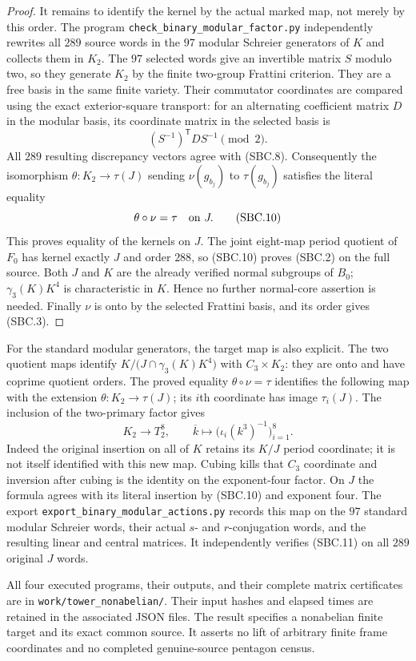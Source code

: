 \begin{proof}
It remains to identify the kernel by the actual marked map, not
merely by this order.  The program
\texttt{check\_binary\_modular\_factor.py} independently rewrites all
$289$ source words in the $97$ modular Schreier generators of $K$
and collects them in $K_2$.  The $97$ selected words give an
invertible matrix $S$ modulo two, so they generate $K_2$ by the
finite two-group Frattini criterion.  They are a free basis in the
same finite variety.  Their commutator coordinates are compared
using the exact exterior-square transport: for an alternating
coefficient matrix $D$ in the modular basis, its coordinate matrix
in the selected basis is
\[
                  (S^{-1})^{\mathsf T}DS^{-1}\pmod2.
\tag{SBC.9}
\]
All $289$ resulting discrepancy vectors agree with (SBC.8).
Consequently the isomorphism $\theta:K_2\to\tau(J)$ sending
$\nu(g_{b_j})$ to $\tau(g_{b_j})$ satisfies the literal equality
\[
                         \theta\circ\nu=\tau
                    \quad\hbox{on }J.
\tag{SBC.10}
\]
This proves equality of the kernels on $J$.  The joint eight-map
period quotient of $F_0$ has kernel exactly $J$ and order $288$,
so (SBC.10) proves (SBC.2) on the full source.  Both $J$ and $K$
are the already verified normal subgroups of $B_0$;
$\gamma_3(K)K^4$ is characteristic in $K$.  Hence no further
normal-core assertion is needed.  Finally $\nu$ is onto by the
selected Frattini basis, and its order gives (SBC.3).
\end{proof}

For the standard modular generators, the target map is also explicit.
The two quotient maps identify $K/\bigl(J\cap\gamma_3(K)K^4\bigr)$
with $C_3\times K_2$: they are onto and have coprime quotient orders.
The proved equality $\theta\circ\nu=\tau$ identifies the following
map with the extension $\theta:K_2\to\tau(J)$; its $i$th coordinate
has image $\tau_i(J)$.  The inclusion of the two-primary factor gives
\[
 K_2\longrightarrow T_2^8,\qquad
       \overline k\longmapsto
       \bigl(\iota_i(k^3)^{-1}\bigr)_{i=1}^8.
\tag{SBC.11}
\]
Indeed the original insertion on all of $K$ retains its $K/J$
period coordinate; it is not itself identified with this new map.
Cubing kills that $C_3$ coordinate and inversion after cubing is
the identity on the exponent-four factor.  On $J$ the formula
agrees with its literal insertion by (SBC.10) and exponent four.  The export
\texttt{export\_binary\_modular\_actions.py} records this map on
the $97$ standard modular Schreier words, their actual $s$- and
$r$-conjugation words, and the resulting linear and central matrices.
It independently verifies (SBC.11) on all $289$ original $J$ words.

All four executed programs, their outputs, and their complete
matrix certificates are in \texttt{work/tower\_nonabelian/}.
Their input hashes and elapsed times are retained in the associated
JSON files.  The result specifies a nonabelian finite target and its
exact common source.  It asserts no lift of arbitrary finite frame
coordinates and no completed genuine-source pentagon census.
